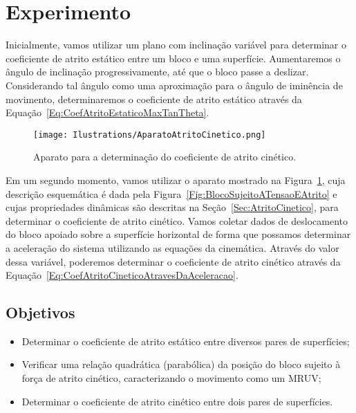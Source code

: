 \section{Experimento}

Inicialmente, vamos utilizar um plano com inclinação variável para determinar o coeficiente de atrito estático entre um bloco e uma superfície. Aumentaremos o ângulo de inclinação progressivamente, até que o bloco passe a deslizar. Considerando tal ângulo como uma aproximação para o ângulo de iminência de movimento, determinaremos o coeficiente de atrito estático através da Equação~\eqref{Eq:CoefAtritoEstaticoMaxTanTheta}.

\begin{figure}[htb]\forcerectofloat
\texttt{[image: Ilustrations/AparatoAtritoCinetico.png]}
\caption{Aparato para a determinação do coeficiente de atrito cinético.\label{Fig:AparatoAtritoCinetico}}
\end{figure}

Em um segundo momento, vamos utilizar o aparato mostrado na Figura~\ref{Fig:AparatoAtritoCinetico}, cuja descrição esquemática é dada pela Figura~\ref{Fig:BlocoSujeitoATensaoEAtrito} e cujas propriedades dinâmicas são descritas na Seção~\ref{Sec:AtritoCinetico}, para determinar o coeficiente de atrito cinético. Vamos coletar dados de deslocamento do bloco apoiado sobre a superfície horizontal de forma que possamos determinar a aceleração do sistema utilizando as equações da cinemática. Através do valor dessa variável, poderemos determinar o coeficiente de atrito cinético através da Equação~\eqref{Eq:CoefAtritoCineticoAtravesDaAceleracao}.

\pagebreak
\subsection{Objetivos}

\begin{itemize}
	\item Determinar o coeficiente de atrito estático entre diversos pares de superfícies;
	\item Verificar uma relação quadrática (parabólica) da posição do bloco sujeito à força de atrito cinético, caracterizando o movimento como um MRUV;
	\item Determinar o coeficiente de atrito cinético entre dois pares de superfícies.
\end{itemize}

